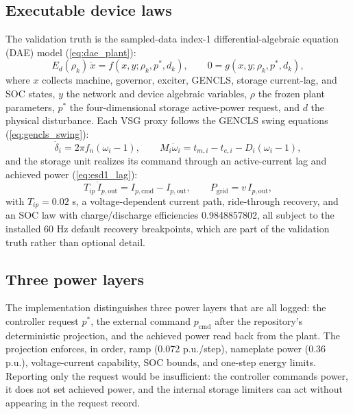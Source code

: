 \documentclass[journal]{IEEEtran}
\begin{document}
\subsection{Executable device laws}
\label{sec:device-laws}

The validation truth is the sampled-data index-1 differential-algebraic equation (DAE) model (\ref{eq:dae_plant}):
\begin{equation}
E_d(\rho_k)\,\dot{x} = f(x,y;\rho_k,p^*,d_k), \qquad 0 = g(x,y;\rho_k,p^*,d_k),
\label{eq:dae_plant}
\end{equation}
where $x$ collects machine, governor, exciter, GENCLS, storage current-lag, and SOC states, $y$ the network and device algebraic variables, $\rho$ the frozen plant parameters, $p^*$ the four-dimensional storage active-power request, and $d$ the physical disturbance. Each VSG proxy follows the GENCLS swing equations (\ref{eq:gencls_swing}):
\begin{equation}
\dot{\delta}_i = 2\pi f_n(\omega_i-1), \qquad M_i\dot{\omega}_i = t_{m,i} - t_{e,i} - D_i(\omega_i-1),
\label{eq:gencls_swing}
\end{equation}
and the storage unit realizes its command through an active-current lag and achieved power (\ref{eq:esd1_lag}):
\begin{equation}
T_{ip}\,\dot{I}_{p,\mathrm{out}} = I_{p,\mathrm{cmd}} - I_{p,\mathrm{out}}, \qquad P_{\mathrm{grid}} = v\,I_{p,\mathrm{out}},
\label{eq:esd1_lag}
\end{equation}
with $T_{ip} = 0.02$ s, a voltage-dependent current path, ride-through recovery, and an SOC law with charge/discharge efficiencies 0.9848857802, all subject to the installed 60 Hz default recovery breakpoints, which are part of the validation truth rather than optional detail.

\subsection{Three power layers}
\label{sec:power-layers}

The implementation distinguishes three power layers that are all logged: the controller request $p^*$, the external command $p_{\mathrm{cmd}}$ after the repository's deterministic projection, and the achieved power read back from the plant. The projection enforces, in order, ramp (0.072 p.u./step), nameplate power (0.36 p.u.), voltage-current capability, SOC bounds, and one-step energy limits. Reporting only the request would be insufficient: the controller commands power, it does not set achieved power, and the internal storage limiters can act without appearing in the request record.
\end{document}

